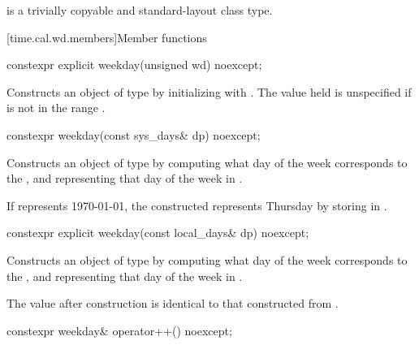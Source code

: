 \pnum
{} is a trivially copyable and standard-layout class type.

[time.cal.wd.members]{Member functions}

%
\begin{itemdecl}
constexpr explicit weekday(unsigned wd) noexcept;
\end{itemdecl}

\begin{itemdescr}
\pnum
\effects
Constructs an object of type  by
initializing  with .
The value held is unspecified if  is not in the range .
\end{itemdescr}

%
\begin{itemdecl}
constexpr weekday(const sys_days& dp) noexcept;
\end{itemdecl}

\begin{itemdescr}
\pnum
\effects
Constructs an object of type  by
computing what day of the week corresponds to the  ,
and representing that day of the week in .

\pnum
\begin{example}
If  represents 1970-01-01,
the constructed  represents Thursday
by storing  in .
\end{example}
\end{itemdescr}

%
\begin{itemdecl}
constexpr explicit weekday(const local_days& dp) noexcept;
\end{itemdecl}

\begin{itemdescr}
\pnum
\effects
Constructs an object of type  by
computing what day of the week corresponds to the  ,
and representing that day of the week in .

\pnum
\remarks
The value after construction is identical to that constructed from
.
\end{itemdescr}

%
\begin{itemdecl}
constexpr weekday& operator++() noexcept;
\end{itemdecl}

